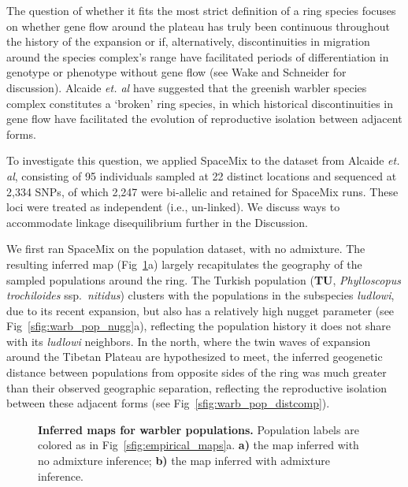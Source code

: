 \documentclass[10pt,letterpaper]{article}
\begin{document}
The question of whether it fits the most strict definition of a ring species focuses on whether gene flow around the plateau has truly been continuous throughout the history of the expansion or if, alternatively, discontinuities in migration around the species complex's range have facilitated periods of differentiation in genotype or phenotype without gene flow \cite{Mayr1942, Mayr1970, coyne_orr_speciation} (see Wake and Schneider \cite{wake_schneider1998} for discussion). 
Alcaide \emph{et. al} \cite{alcaide2014genomic} have suggested that the greenish warbler species complex constitutes a `broken' ring species, in which historical discontinuities in gene flow have facilitated the evolution of reproductive isolation between adjacent forms.  

To investigate this question, we applied SpaceMix to the dataset from Alcaide \emph{et. al}\cite{alcaide2014genomic}, 
consisting of 95 individuals sampled at 22 distinct locations and sequenced at 2,334 SNPs, of which 2,247 were bi-allelic and retained for SpaceMix runs.  These loci were treated as independent (i.e., un-linked).  We discuss ways to accommodate linkage disequilibrium further in the Discussion.

We first ran SpaceMix on the population dataset, with no admixture. The resulting inferred map (Fig\ \ref{sfig:warbler_pop}a) largely recapitulates the geography of the sampled populations around the ring.  The Turkish population (\textbf{TU}, \textit{Phylloscopus trochiloides} ssp.\ \textit{nitidus}) clusters with the populations in the subspecies \textit{ludlowi}, due to its recent expansion, but also has a relatively high nugget parameter (see Fig\ \ref{sfig:warb_pop_nugg}a), reflecting the population history it does not share with its \textit{ludlowi} neighbors.  In the north, where the twin waves of expansion around the Tibetan Plateau are hypothesized to meet, the inferred geogenetic distance between populations from opposite sides of the ring was much greater than their observed geographic separation, reflecting the reproductive isolation between these adjacent forms (see Fig\ \ref{sfig:warb_pop_distcomp}).  
%
\begin{figure}[ht!]
\begin{center}
\end{center}
\caption{
\textbf{Inferred maps for warbler populations.}
Population labels are colored as in Fig\ \ref{sfig:empirical_maps}a. 
	\textbf{a)} 
	the map inferred with no admixture inference; 
	\textbf{b)}
	the map inferred with admixture inference.
}\label{sfig:warbler_pop}
\end{figure}
\end{document}
